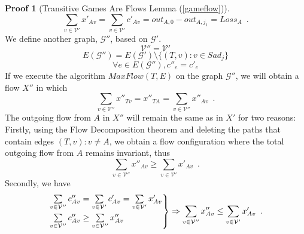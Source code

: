 \documentclass[11pt]{llncs}
\theoremstyle{definition}
\newtheorem{sepproof}{Proof}
\begin{document}
\begin{sepproof}[Transitive Games Are Flows Lemma (\ref{gameflow})]
\begin{equation}
       \label{xprimeequalloss}
          \sum\limits_{v \in \mathcal{V}'}x'_{Av} = \sum\limits_{v \in \mathcal{V}'}c'_{Av} = out_{A, 0} - out_{A, j_1} =
          Loss_A \enspace.
       \end{equation}
       We define another graph, $\mathcal{G}''$, based on $\mathcal{G}'$.
       \begin{equation*}
          \mathcal{V}'' = \mathcal{V}'
       \end{equation*}
       \begin{equation*}
          E(\mathcal{G}'') = E(\mathcal{G}') \setminus \{(T, v) : v \in Sad_j\}
       \end{equation*}
       \begin{equation*}
          \forall e \in E(\mathcal{G}''), c''_e = c'_e
       \end{equation*}
       If we execute the algorithm $MaxFlow(T, E)$ on the graph $\mathcal{G}''$, we will obtain a flow $X''$ in which
       \begin{equation*}
          \sum\limits_{v \in \mathcal{V}''}x''_{Tv} = x''_{TA} = \sum\limits_{v \in \mathcal{V}''}x''_{Av} \enspace.
       \end{equation*}
       The outgoing flow from $A$ in $X''$ will remain the same as in $X'$ for two reasons: Firstly, using the Flow
       Decomposition theorem \cite{amo} and deleting the paths that contain edges $\left(T, v\right): v \neq A$, we
       obtain a flow configuration where the total outgoing flow from $A$ remains invariant,
       thus
       \begin{equation*}
          \sum\limits_{v \in \mathcal{V}''}x''_{Av} \geq \sum\limits_{v \in \mathcal{V}'}x'_{Av} \enspace.
       \end{equation*}
       Secondly, we have
       \begin{equation*}
          \begin{rcases}
             \sum\limits_{v \in \mathcal{V}''}c''_{Av} = \sum\limits_{v \in \mathcal{V}'}c'_{Av} = \sum\limits_{v \in
             \mathcal{V}'}x'_{Av} \\
             \sum\limits_{v \in \mathcal{V}''}c''_{Av} \geq \sum\limits_{v \in \mathcal{V}''}x''_{Av}
          \end{rcases}
          \Rightarrow \sum\limits_{v \in \mathcal{V}''}x''_{Av} \leq \sum\limits_{v \in \mathcal{V}'}x'_{Av} \enspace.
       \end{equation*}

\end{sepproof}
\end{document}
